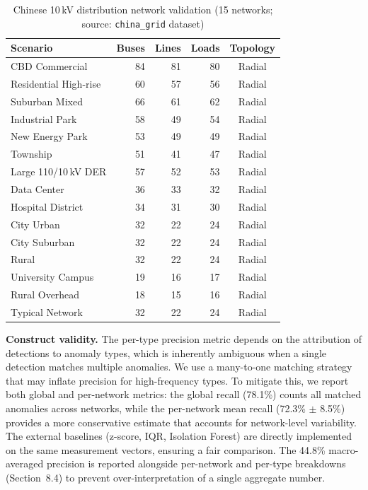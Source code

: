 \documentclass[research]{fcs}
\begin{document}
\begin{table}[htbp]
\centering
\caption{Chinese 10\,kV distribution network validation (15 networks; source: \texttt{china\_grid} dataset)}
\label{tab:chinese_validation}
\begin{tabular}{@{}lrrrc@{}}
\toprule
Scenario & Buses & Lines & Loads & Topology \\
\midrule
CBD Commercial & 84 & 81 & 80 & Radial \\
Residential High-rise & 60 & 57 & 56 & Radial \\
Suburban Mixed & 66 & 61 & 62 & Radial \\
Industrial Park & 58 & 49 & 54 & Radial \\
New Energy Park & 53 & 49 & 49 & Radial \\
Township & 51 & 41 & 47 & Radial \\
Large 110/10\,kV DER & 57 & 52 & 53 & Radial \\
Data Center & 36 & 33 & 32 & Radial \\
Hospital District & 34 & 31 & 30 & Radial \\
City Urban & 32 & 22 & 24 & Radial \\
City Suburban & 32 & 22 & 24 & Radial \\
Rural & 32 & 22 & 24 & Radial \\
University Campus & 19 & 16 & 17 & Radial \\
Rural Overhead & 18 & 15 & 16 & Radial \\
Typical Network & 32 & 22 & 24 & Radial \\
\bottomrule
\end{tabular}
\end{table}

\textbf{Construct validity.} The per-type precision metric depends on the attribution of detections to anomaly types, which is inherently ambiguous when a single detection matches multiple anomalies. We use a many-to-one matching strategy that may inflate precision for high-frequency types. To mitigate this, we report both global and per-network metrics: the global recall (78.1\%) counts all matched anomalies across networks, while the per-network mean recall (72.3\% $\pm$ 8.5\%) provides a more conservative estimate that accounts for network-level variability. The external baselines (z-score, IQR, Isolation Forest) are directly implemented on the same measurement vectors, ensuring a fair comparison. The 44.8\% macro-averaged precision is reported alongside per-network and per-type breakdowns (Section~8.4) to prevent over-interpretation of a single aggregate number.
\end{document}
